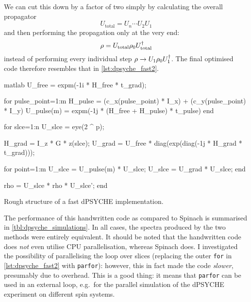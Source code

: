 We can cut this down by a factor of two simply by calculating the overall propagator
\begin{equation}
    \label{eq:overall_propagator}
    U_\text{total} = U_n\cdots U_2U_1
\end{equation}
and then performing the propagation only at the very end:
\begin{equation}
    \label{eq:overall_propagation}
    \rho = U_\text{total} \rho_0 U_\text{total}^\dagger
\end{equation}
instead of performing every individual step $\rho \to U_1\rho_0U_1^\dagger$.
The final optimised code therefore resembles that in \cref{lst:dpsyche_fast2}.

\begin{mylisting}[htb]
    \centering
\begin{tcbminted}{matlab}
U_free = expm(-1i * H_free * t_grad);

for pulse_point=1:m
    H_pulse = (c_x(pulse_point) * I_x) + (c_y(pulse_point) * I_y)
    U_pulse(m) = expm(-1j * (H_free + H_pulse) * t_pulse)
end

for slce=1:n
    U_slce = eye(2 ^ p);

    H_grad = I_z * G * z(slce);
    U_grad = U_free * diag(exp(diag(-1j * H_grad * t_grad)));

    for point=1:m
        U_slce = U_pulse(m) * U_slce;
        U_slce = U_grad * U_slce;
    end

    rho = U_slce * rho * U_slce';
end
\end{tcbminted}
\caption[Fast dPSYCHE code]{Rough structure of a fast dPSYCHE implementation.}
\label{lst:dpsyche_fast2}
\end{mylisting}

The performance of this handwritten code as compared to Spinach is summarised in \cref{tbl:dpsyche_simulations}.
In all cases, the spectra produced by the two methods were entirely equivalent.
It should be noted that the handwritten code does \textit{not} even utilise CPU parallelisation, whereas Spinach does.
I investigated the possibility of parallelising the loop over slices (replacing the outer \texttt{for} in \cref{lst:dpsyche_fast2} with \texttt{parfor}): however, this in fact made the code \textit{slower}, presumably due to overhead.
This is a good thing: it means that \texttt{parfor} can be used in an external loop, e.g.\ for the parallel simulation of the dPSYCHE experiment on different spin systems.

